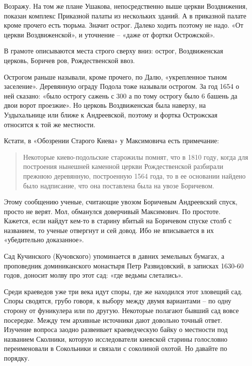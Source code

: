 Возражу. На том же плане Ушакова, непосредственно выше церкви Воздвижения, показан комплекс Приказной палаты из нескольких зданий. А в приказной палате кроме прочего есть тюрьма. Значит острог. Далеко ходить поэтому не надо. «От церкви Воздвиженской», и уточнение – «даже от фортки Острожской».

В грамоте описываются места строго сверху вниз: острог, Воздвиженская церковь, Боричев ров, Рождественской ввоз.

Острогом раньше называли, кроме прочего, по Далю, «укрепленное тыном заселение». Деревянную ограду Подола тоже называли острогом. За год 1654 о ней сказано: «было острогу сажень с 300 а по тому острогу было 6 башень да двои ворот проезжие»\cite[том X, стр. 387]{akty}. Но церковь Воздвиженская была наверху, на Уздыхальнице или ближе к Андреевской, поэтому и фортка Острожская относится к той же местности.

Кстати, в «Обозрении Старого Киева» у Максимовича есть примечание: 

\begin{quotation}
Некоторые киево-подольские старожилы помнят, что в 1810 году, когда для построения нынешней каменной церкви Рождественской разбирали прежнюю деревянную, построенную 1564 года, то в ее основании найдено было надписание, что она поставлена была на увозе Боричевом. 
\end{quotation}

Этому сообщению ученые, считающие увозом Боричевым Андреевский спуск, просто не верят. Мол, обманулся доверчивый Максимович. По простоте. Кажется, если найдут кем-то в старину вбитый на Боричевом спуске столб с названием, то ученые отвергнут и сей довод. Ибо не вписывается в их «убедительно доказанное».

Сад Кучинского (Кучовского) упоминается в давних земельных бумагах, а проповедник доминиканского монастыря Петр Развидовский, в записках 1630-60 годов, доносит молву про этот сад: «где ведьмы слетались».

Среди краеведов уже три века идут споры, где же находился этот зловещий сад. Споры сводятся, грубо говоря, к выбору между двумя вариантами – по одну сторону от фуникулера или по другую. Некоторые полагают бывший сад вовсе посередке. Между тем архивные источники дают довольно точный ответ. Изучение вопроса заодно развеивает краеведческую байку о местности под названием Сколники, которую исследователи киевской старины голословно переименовали в Сокольники и связали с соколиной охотой. Но давайте по порядку.

